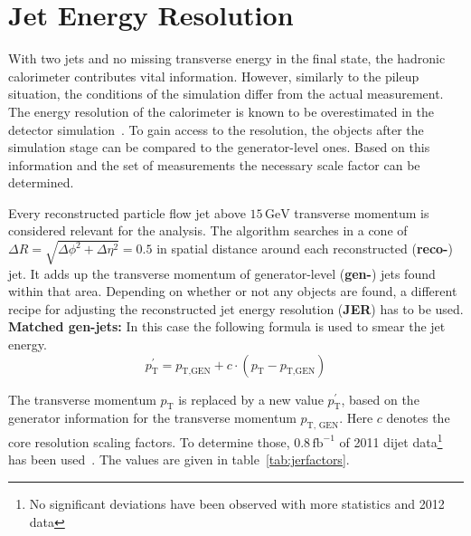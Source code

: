 \section{Jet Energy Resolution}
\label{sec:jer}

With two jets and no missing transverse energy in the final state, the hadronic calorimeter contributes vital information. However, similarly to the pileup situation, the conditions of the simulation differ from the actual measurement. The energy resolution of the calorimeter is known to be overestimated in the detector simulation~\cite{jer}. To gain access to the resolution, the objects after the simulation stage can be compared to the generator-level ones. Based on this information and the set of measurements the necessary scale factor can be determined.

Every reconstructed particle flow jet above $15\,\text{GeV}$ transverse momentum is considered relevant for the analysis. The algorithm searches in a cone of $\Delta R = \sqrt{\Delta\phi^2 + \Delta\eta^2} = 0.5$ in spatial distance around each reconstructed (\textbf{reco-}) jet. It adds up the transverse momentum of generator-level (\textbf{gen-}) jets found within that area. Depending on whether or not any objects are found, a different recipe for adjusting the reconstructed jet energy resolution (\textbf{JER}) has to be used. \\


\textbf{Matched gen-jets:} In this case the following formula is used to smear the jet energy.
\begin{equation}
  \label{eq:jermatched}
  p^\prime_{\text{T}} = p_{\text{T}, \text{GEN}} + c \cdot (p_{\text{T}} - p_{\text{T}, \text{GEN}})
\end{equation}
  
\noindent The transverse momentum $p_{\text{T}}$ is replaced by a new value $p_{\text{T}}^\prime$, based on the generator information for the transverse momentum $p_{\text{T, GEN}}$. Here $c$ denotes the core resolution scaling factors. To determine those, $0.8\,\text{fb}^{-1}$ of 2011 dijet data\footnote{No significant deviations have been observed with more statistics and 2012 data} has been used~\cite{jer}. The values are given in table~\ref{tab:jerfactors}.

